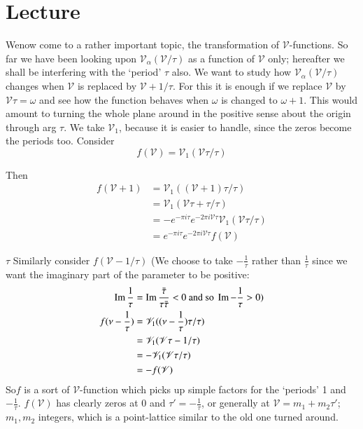 \chapter{Lecture}\label{part2:lec12}

We\pageoriginale now come to a rather important topic, the
transformation of $\mathscr{V}$-functions. So far we have been looking
upon $\mathscr{V}_\alpha (\mathscr{V}/ \tau)$ as a function of
$\mathscr{V}$ only; hereafter we shall be interfering with the
`period' $\tau$ also. We want to study how $\mathscr{V}_\alpha
(\mathscr{V}/ \tau)$ changes when $\mathscr{V}$ is replaced by
$\mathscr{V}+ 1/\tau$. For this it is enough if we replace
$\mathscr{V}$ by $\mathscr{V} \tau = \omega$ and see how the function
behaves when $\omega$ is changed to $\omega+1$. This would amount to
turning the whole plane around in the positive sense about the origin
through arg $\tau$. We take $\mathscr{V}_1$, because it is easier to
handle, since the zeros become the periods too. Consider
$$
f(\mathscr{V}) = \mathscr{V}_1 (\mathscr{V} \tau/\tau)
$$

Then 
\begin{align*}
  f(\mathscr{V}+1) & = \mathscr{V}_1 ((\mathscr{V}+1)\tau / \tau)\\
  & = \mathscr{V}_1 (\mathscr{V} \tau + \tau/\tau)\\
  & = - e^{-\pi i \tau} e^{-2 \pi i \mathscr{V} \tau} \mathscr{V}_1
  (\mathscr{V} \tau/ \tau)\\
  & = e^{- \pi i \tau} e^{- 2 \pi i \mathscr{V} \tau} f(\mathscr{V})
\end{align*}

$\tau$ Similarly consider $f(\mathscr{V}- 1/\tau)$ (We choose to take
$- \frac{1}{\tau}$ rather than $\frac{1}{\tau}$ since we want the
imaginary part of the parameter to be positive:
\begin{align*}
  \operatorname{Im} \frac{1}{\tau} & = \operatorname{Im} \frac{\bar{\tau}}{\tau \bar{\tau}} < 0
  ~\text{and so}~ \operatorname{Im}  - \frac{1}{\tau} > 0)\\
  f(\nu - \frac{1}{\tau}) & = \mathscr{V}_1 ((\nu - \frac{1}{\tau})
  \tau/\tau)\\
  & = \mathscr{V}_1 (\mathscr{V} \tau - 1/ \tau)\\
  & = - \mathscr{V}_1 (\mathscr{V} \tau/ \tau)\\
  & =- f(\mathscr{V})
\end{align*}
So\pageoriginale $f$ is a sort of $\mathscr{V}$-function which picks up simple
factors for the `periods' 1 and $- \frac{1}{\tau}$. $f(\mathscr{V})$
has clearly zeros at 0 and $\tau' =-\frac{1}{\tau}$, or generally at
$\mathscr{V} = m_1 + m_2 \tau'$; $m_1, m_2$ integers, which is a
point-lattice similar to the old one turned around. 

